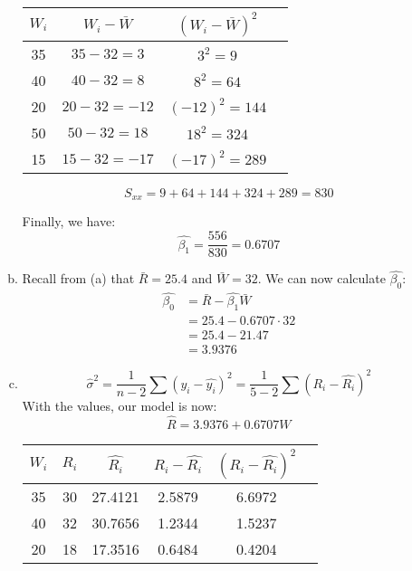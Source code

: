 \documentclass[12pt]{article}
\begin{document}
\begin{enumerate}[1.]
\begin{enumerate}[(a)]
\begin{center}
\begin{tabular}{|c|c|c|c|}
                    $W_i$ & $W_i - \bar{W}$ & $(W_i - \bar{W})^2$\\
                    \hline
                    35 & $35 - 32 = 3$ & $3^2 = 9$ \\
                    \hline
                    40 & $40 - 32 = 8$ & $8^2 = 64$ \\
                    \hline
                    20 & $20 - 32 = -12$ & $(-12)^2 = 144$ \\
                    \hline
                    50 & $50 - 32 = 18$ & $18^2 = 324$ \\
                    \hline
                    15 & $15 - 32 = -17$ & $(-17)^2 = 289$ \\
                    \hline
                \end{tabular}
                \[ S_{xx} = 9 + 64 + 144 + 324 + 289 = 830 \]
            \end{center}
            Finally, we have:
            \[ \hat{\beta_1} = \frac{556}{830} = 0.6707 \]
            \item Recall from (a) that $\bar{R} = 25.4$ and $\bar{W} = 32$. We can now calculate $\hat{\beta_0}$:
            \begin{align*}
                \hat{\beta_0} &= \bar{R} - \hat{\beta_1} \bar{W} \\
                &= 25.4 - 0.6707 \cdot 32 \\
                &= 25.4 - 21.47 \\
                &= 3.9376
            \end{align*}
            \item 
            \[ \hat{\sigma}^2 =  \frac{1}{n-2} \sum (y_i - \hat{y_i})^2 = \frac{1}{5-2} \sum (R_i - \hat{R_i})^2 \]
            With the values, our model is now:
            \[ \hat{R} = 3.9376 + 0.6707W \]
            \begin{center}
                \begin{tabular}{|c|c|c|c|c|c|}
                    \hline
                    $W_i$ & $R_i$ & $\hat{R_i}$ & $R_i - \hat{R_i}$ & $(R_i - \hat{R_i})^2$\\
                    \hline
                    35 & 30 & 27.4121 & 2.5879 & 6.6972 \\
                    \hline
                    40 & 32 & 30.7656 & 1.2344 & 1.5237 \\
                    \hline
                    20 & 18 & 17.3516 & 0.6484 & 0.4204 \\
                    \hline

\end{tabular}
\end{center}
\end{enumerate}
\end{enumerate}
\end{document}
